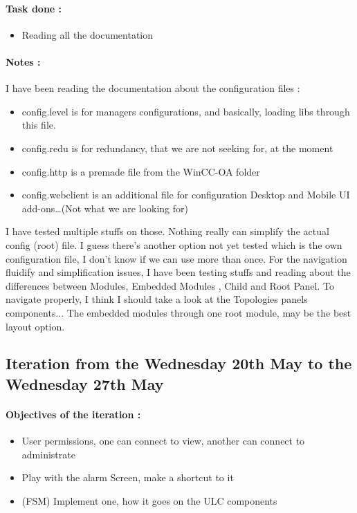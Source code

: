 \documentclass[a4paper, 12pt]{article}
\begin{document}
\paragraph{Task done :}
\begin{itemize}
    \item Reading all the documentation
\end{itemize}

\paragraph{Notes :} 
I have been reading the documentation about the configuration files :
\begin{itemize}
    \item config.level is for managers configurations, and basically, loading libs through this file.
    \item config.redu is for redundancy, that we are not seeking for, at the moment
    \item config.http is a premade file from the WinCC-OA folder
    \item config.webclient is an additional file for configuration Desktop and Mobile UI add-ons\dots (Not what we are looking for)
\end{itemize}
I have tested multiple stuffs on those. Nothing really can simplify the actual config (root) file.
I guess there's another option not yet tested which is the own configuration file, I don't know if we can use more than once.\newline
For the navigation fluidify and simplification issues, I have been testing stuffs and reading about the differences between Modules, Embedded Modules , Child and Root Panel.\newline
To navigate properly, I think I should take a look at the Topologies panels components... The embedded modules through one root module, may be the best layout option.

\subsection{Iteration from the Wednesday 20th May to the Wednesday 27th May}
\paragraph{Objectives of the iteration :}
\begin{itemize}
    \item User permissions, one can connect to view, another can connect to administrate
    \item Play with the alarm Screen, make a shortcut to it
    \item (FSM) Implement one, how it goes on the ULC components
\end{itemize}
\end{document}
